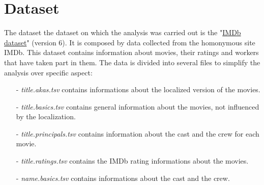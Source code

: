 \documentclass[14pt]{extarticle}
\begin{document}
\section{Dataset}
The dataset the dataset on which the analysis was carried out is the "\href{https://www.kaggle.com/ashirwadsangwan/imdb-dataset}{IMDb dataset}" (version 6). It is composed by data collected from the homonymous site IMDb. This dataset contains information about movies, their ratings and workers that have taken part in them. The data is divided into several files to simplify the analysis over specific aspect:
\begin{itemize}[leftmargin=*]
\vspace{-0.4cm}\item[-]{\it title.akas.tsv} contains informations about the localized version of the movies.
\vspace{-0.4cm}\item[-]{\it title.basics.tsv} contains general information about the movies, not influenced by the localization.
\vspace{-0.4cm}\item[-]{\it title.principals.tsv} contains information about the cast and the crew for each movie.
\vspace{-0.4cm}\item[-]{\it title.ratings.tsv} contains the IMDb rating informations about the movies.
\vspace{-1.0cm}\item[-]{\it name.basics.tsv} contains informations about the cast and the crew.
\end{itemize}
\end{document}
